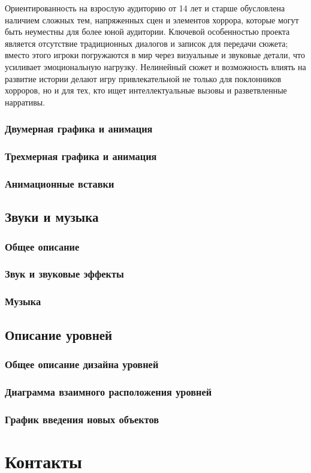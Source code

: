 \documentclass{article}
\begin{document}
    Ориентированность на взрослую аудиторию от 14 лет и старше обусловлена наличием сложных тем, напряженных сцен и элементов хоррора, которые могут быть неуместны для более юной аудитории. Ключевой особенностью проекта является отсутствие традиционных диалогов и записок для передачи сюжета; вместо этого игроки погружаются в мир через визуальные и звуковые детали, что усиливает эмоциональную нагрузку. Нелинейный сюжет и возможность влиять на развитие истории делают игру привлекательной не только для поклонников хорроров, но и для тех, кто ищет интеллектуальные вызовы и разветвленные нарративы.
   
	\subsubsection{Двумерная графика и анимация}
	
	\subsubsection{Трехмерная графика и анимация}
	
	\subsubsection{Анимационные вставки}
	
	\subsection{Звуки и музыка}
	
	\subsubsection{Общее описание}
	
	\subsubsection{Звук и звуковые эффекты}
	
	\subsubsection{Музыка}
	
	\subsection{Описание уровней}
	
	\subsubsection{Общее описание дизайна уровней}
	
	\subsubsection{Диаграмма взаимного расположения уровней}
	
	\subsubsection{График введения новых объектов}
	
	\newpage
	\section{Контакты}
	
	\newpage
	
\end{document}
